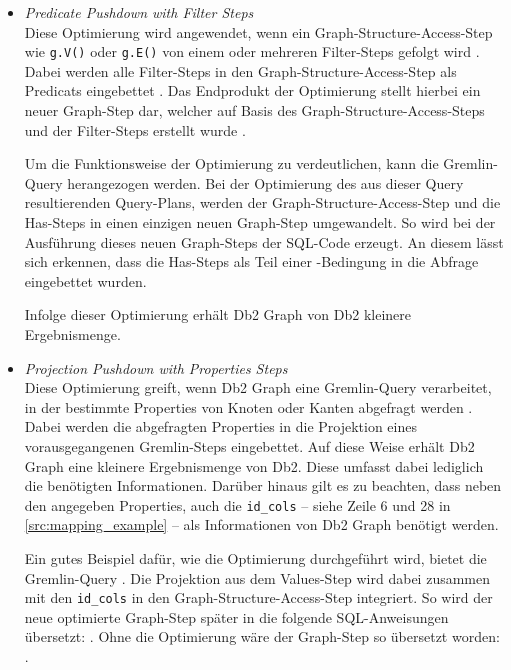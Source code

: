\begin{itemize}
    \item \textit{Predicate Pushdown with Filter Steps}\\
    Diese Optimierung wird angewendet, wenn ein Graph-Structure-Access-Step wie \texttt{g.V()} oder \texttt{g.E()} von einem oder mehreren Filter-Steps gefolgt wird \cite{sigmod_tian}. Dabei werden alle Filter-Steps in den Graph-Structure-Access-Step als Predicats eingebettet \cite{sigmod_tian}. Das Endprodukt der Optimierung stellt hierbei ein neuer Graph-Step dar, welcher auf Basis des Graph-Structure-Access-Steps und der Filter-Steps erstellt wurde \cite{sigmod_tian}. 
    
    Um die Funktionsweise der Optimierung zu verdeutlichen, kann die Gremlin-Query  herangezogen werden. Bei der Optimierung des aus dieser Query resultierenden Query-Plans, werden der Graph-Structure-Access-Step und die Has-Steps in einen einzigen neuen Graph-Step umgewandelt. So wird bei der Ausführung dieses neuen Graph-Steps der SQL-Code  erzeugt. An diesem lässt sich erkennen, dass die Has-Steps als Teil einer -Bedingung in die Abfrage eingebettet wurden.

    Infolge dieser Optimierung erhält Db2 Graph von Db2  kleinere Ergebnismenge.

    \item \textit{Projection Pushdown with Properties Steps}\\
    Diese Optimierung greift, wenn Db2 Graph eine Gremlin-Query verarbeitet, in der bestimmte Properties von Knoten oder Kanten abgefragt werden \cite{sigmod_tian}. Dabei werden die abgefragten Properties in die Projektion eines vorausgegangenen Gremlin-Steps eingebettet. Auf diese Weise erhält Db2 Graph eine kleinere Ergebnismenge von Db2. Diese umfasst dabei lediglich die benötigten Informationen. Darüber hinaus gilt es zu beachten, dass neben den angegeben Properties, auch die \texttt{id\_cols} -- siehe Zeile 6 und 28 in \autoref{src:mapping_example} -- als Informationen von Db2 Graph benötigt werden. 

    Ein gutes Beispiel dafür, wie die Optimierung durchgeführt wird, bietet die Gremlin-Query . Die Projektion aus dem Values-Step wird dabei zusammen mit den \texttt{id\_cols} in den Graph-Structure-Access-Step integriert. So wird der neue optimierte Graph-Step später in die folgende SQL-Anweisungen übersetzt: . Ohne die Optimierung wäre der Graph-Step so übersetzt worden: .


\end{itemize}
